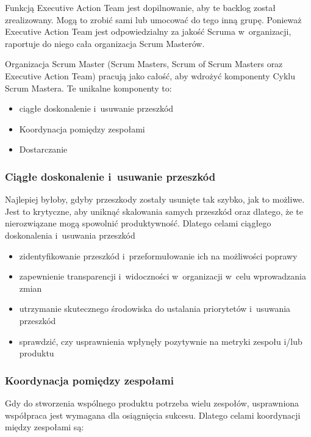 \documentclass[12pt,a4paper,parskip=full]{scrartcl}
\begin{document}
Funkcją Executive Action Team jest dopilnowanie, aby te backlog został zrealizowany. Mogą to zrobić sami lub umocować do tego inną grupę. Ponieważ Executive Action Team jest odpowiedzialny za jakość Scruma w~organizacji, raportuje do niego cała organizacja Scrum Masterów.

Organizacja Scrum Master (Scrum Masters, Scrum of Scrum Masters oraz Executive Action Team) pracują jako całość, aby wdrożyć komponenty Cyklu Scrum Mastera. Te unikalne komponenty to:


\begin{itemize}
\itemsep1pt\parskip0pt
\item
  ciągłe doskonalenie i~usuwanie przeszkód
\item
  Koordynacja pomiędzy zespołami
\item
  Dostarczanie
\end{itemize}

\subsubsection{Ciągłe doskonalenie i~usuwanie przeszkód}\label{Continuous-improvement-and-impediment-removal}

Najlepiej byłoby, gdyby przeszkody zostały usunięte tak szybko, jak to możliwe. Jest to krytyczne, aby uniknąć skalowania samych przeszkód oraz dlatego, że te nierozwiązane mogą spowolnić produktywność. Dlatego celami ciągłego doskonalenia i~usuwania przeszkód

\begin{itemize}
\itemsep1pt\parskip0pt
\item
  zidentyfikowanie przeszkód i~przeformułowanie ich na możliwości poprawy
\item
  zapewnienie transparencji i~widoczności w~organizacji w~celu wprowadzania zmian
\item
  utrzymanie skutecznego środowiska do ustalania priorytetów i~usuwania przeszkód
\item
  sprawdzić, czy usprawnienia wpłynęły pozytywnie na metryki zespołu i/lub produktu
\end{itemize}

\subsubsection{Koordynacja pomiędzy zespołami}\label{cross-team-coordination}

Gdy do stworzenia wspólnego produktu potrzeba wielu zespołów,
usprawniona współpraca jest wymagana dla osiągnięcia sukcesu. Dlatego celami koordynacji między zespołami są:
\end{document}
